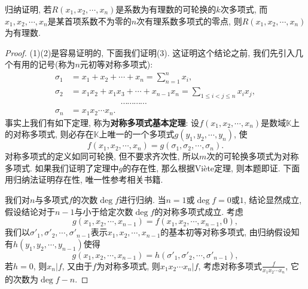 \begin{quizb}
\begin{quizs}
\item 归纳证明, 若\(R(x_1,x_2,\cdots,x_n)\)是\textcolor{green!50!black}{系数为有理数的}可轮换的\(k\)次多项式, 而\(x_1,x_2,\cdots,x_n\)是某首项系数不为零的\(n\)次有理系数多项式的零点, 则\(R(x_1,x_2,\cdots,x_n)\)为有理数.
\end{quizs}
\begin{proof}
(1)(2)是容易证明的, 下面我们证明(3).
这证明这个结论之前, 我们先引入几个有用的记号(称为\(n\)元初等对称多项式):\[\begin{split}
\sigma_1&=x_1+x_2+\cdots+x_n=\sum_{n=1}^{n}x_i,\\
\sigma_2&=x_1x_2+x_1x_3+\cdots+x_{n-1}x_n=\sum_{1\leq i<j\leq n }x_ix_j,\\
&\qquad\qquad\qquad\cdots\cdots\cdots\cdots\\
\sigma_n&=x_1x_2\cdots x_n.
\end{split}\]
事实上我们有如下定理, 称为\textbf{对称多项式基本定理}: 设\(f(x_1,x_2,\cdots,x_n)\)是数域\(\mathbb{K}\)上的对称多项式, 则必存在\(\mathbb{K}\)上唯一的一个多项式\(g(y_1,y_2,\cdots,y_n)\), 使\[f(x_1,x_2,\cdots,x_n)=g(\sigma_1,\sigma_2,\cdots,\sigma_n).\]
对称多项式的定义如同可轮换, 但不要求齐次性, 所以\(m\)次的可轮换多项式为对称多项式. 如果我们证明了定理中\(g\)的存在性, 那么根据Vi\`{e}te定理, 则本题即证. 下面用归纳法证明存在性, 唯一性参考相关书籍.

我们对\(n\)与多项式\(f\)的次数\(\deg f\)进行归纳. 当\(n=1\)或\(\deg f=0\)或\(1\), 结论显然成立, 假设结论对于\(n-1\)与小于给定次数\(\deg f\)的对称多项式成立. 考虑\[g(x_1,x_2,\cdots,x_{n-1})=f(x_1,x_2,\cdots,x_{n-1},0),\]我们以\(\sigma'_1,\sigma'_2,\cdots,\sigma'_{n-1}\)表示\(x_1,x_2,\cdots,x_{n-1}\)的基本初等对称多项式, 由归纳假设知有\(h(y_1,y_2,\cdots,y_{n-1})\)使得\[g(x_1,x_2,\cdots,x_{n-1})=h(\sigma'_1,\sigma'_2,\cdots,\sigma'_{n-1}),\]若\(h=0\), 则\(x_n\big| f\), 又由于\(f\)为对称多项式, 则\(x_1x_2\cdots x_n\big| f\), 考虑对称多项式\(\frac{f}{x_1x_2\cdots x_n}\), 它的次数为\(\deg f -n\). 


\end{proof}
\end{quizb}
